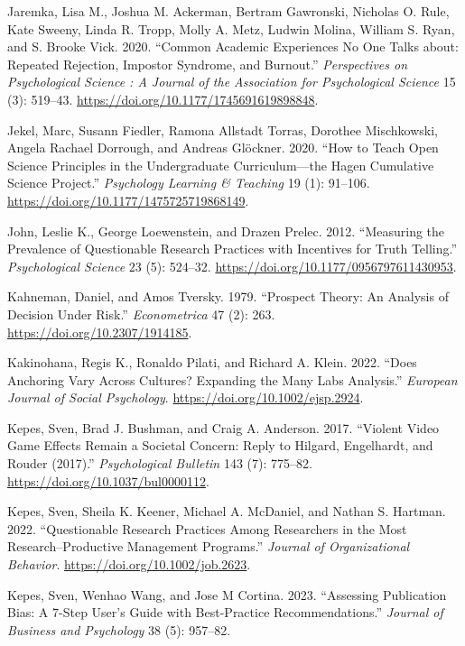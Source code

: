 \documentclass[
  letterpaper,
  DIV=11,
  numbers=noendperiod]{scrreprt}
\newlength{\cslhangindent}
\newenvironment{CSLReferences}[2] %
 {\begin{list}{}{%
  \setlength{\itemindent}{0pt}
  \setlength{\leftmargin}{0pt}
  \setlength{\parsep}{0pt}
  \ifodd #1
   \setlength{\leftmargin}{\cslhangindent}
   \setlength{\itemindent}{-1\cslhangindent}
  \fi
  \setlength{\itemsep}{#2\baselineskip}}}
 {\end{list}}
\begin{document}
\begin{CSLReferences}{1}{0}
Jaremka, Lisa M., Joshua M. Ackerman, Bertram Gawronski, Nicholas O.
Rule, Kate Sweeny, Linda R. Tropp, Molly A. Metz, Ludwin Molina, William
S. Ryan, and S. Brooke Vick. 2020. {``Common Academic Experiences No One
Talks about: Repeated Rejection, Impostor Syndrome, and Burnout.''}
\emph{Perspectives on Psychological Science : A Journal of the
Association for Psychological Science} 15 (3): 519--43.
\url{https://doi.org/10.1177/1745691619898848}.

Jekel, Marc, Susann Fiedler, Ramona Allstadt Torras, Dorothee
Mischkowski, Angela Rachael Dorrough, and Andreas Glöckner. 2020. {``How
to Teach Open Science Principles in the Undergraduate Curriculum---the
Hagen Cumulative Science Project.''} \emph{Psychology Learning {\&}
Teaching} 19 (1): 91--106.
\url{https://doi.org/10.1177/1475725719868149}.

John, Leslie K., George Loewenstein, and Drazen Prelec. 2012.
{``Measuring the Prevalence of Questionable Research Practices with
Incentives for Truth Telling.''} \emph{Psychological Science} 23 (5):
524--32. \url{https://doi.org/10.1177/0956797611430953}.

Kahneman, Daniel, and Amos Tversky. 1979. {``Prospect Theory: An
Analysis of Decision Under Risk.''} \emph{Econometrica} 47 (2): 263.
\url{https://doi.org/10.2307/1914185}.

Kakinohana, Regis K., Ronaldo Pilati, and Richard A. Klein. 2022.
{``Does Anchoring Vary Across Cultures? Expanding the Many Labs
Analysis.''} \emph{European Journal of Social Psychology}.
\url{https://doi.org/10.1002/ejsp.2924}.

Kepes, Sven, Brad J. Bushman, and Craig A. Anderson. 2017. {``Violent
Video Game Effects Remain a Societal Concern: Reply to Hilgard,
Engelhardt, and Rouder (2017).''} \emph{Psychological Bulletin} 143 (7):
775--82. \url{https://doi.org/10.1037/bul0000112}.

Kepes, Sven, Sheila K. Keener, Michael A. McDaniel, and Nathan S.
Hartman. 2022. {``Questionable Research Practices Among Researchers in
the Most Research--Productive Management Programs.''} \emph{Journal of
Organizational Behavior}. \url{https://doi.org/10.1002/job.2623}.

Kepes, Sven, Wenhao Wang, and Jose M Cortina. 2023. {``Assessing
Publication Bias: A 7-Step User's Guide with Best-Practice
Recommendations.''} \emph{Journal of Business and Psychology} 38 (5):
957--82.


\end{CSLReferences}
\end{document}
